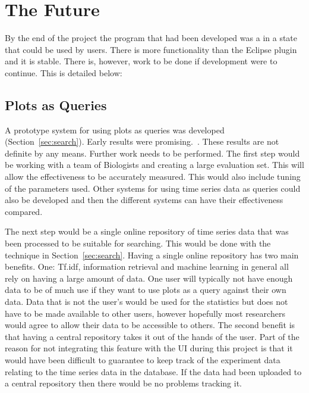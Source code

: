 
\section{The Future}

By the end of the project the program that had been developed was a in a state that could be used by users.  There is more functionality than the Eclipse plugin and it is stable.  There is, however, work to be done if development were to continue.  This is detailed below:

\subsection{Plots as Queries}
A prototype system for using plots as queries was developed (Section~\ref{sec:search}).  Early results were promising.~.  These results are not definite by any means.  Further work needs to be performed.  The first step would be working with a team of Biologists and creating a large evaluation set.  This will allow the effectiveness to be accurately measured.  This would also include tuning of the parameters used.  Other systems for using time series data as queries could also be developed and then the different systems can have their effectiveness compared.

The next step would be a single online repository of time series data that was been processed to be suitable for searching.  This would be done with the technique in Section~\ref{sec:search}.  Having a single online repository has two main benefits.  One: Tf.idf, information retrieval and machine learning in general all rely on having a large amount of data.  One user will typically not have enough data to be of much use if they want to use plots as a query against their own data.  Data that is not the user's would be used for the statistics but does not have to be made available to other users, however hopefully most researchers would agree to allow their data to be accessible to others.  The second benefit is that having a central repository takes it out of the hands of the user.  Part of the reason for not integrating this feature with the \ac{UI} during this project is that it would have been difficult to guarantee to keep track of the experiment data relating to the time series data in the database.  If the data had been uploaded to a central repository then there would be no problems tracking it.

